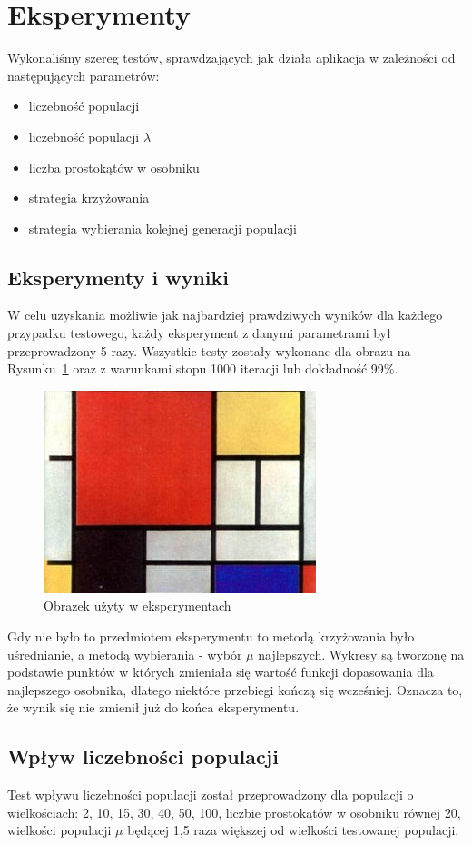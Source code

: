 \section{Eksperymenty}
Wykonaliśmy szereg testów, sprawdzających jak działa aplikacja w zależności od następujących parametrów:
\begin{itemize}
    \item liczebność populacji
    \item liczebność populacji $\lambda$
    \item liczba prostokątów w osobniku
    \item strategia krzyżowania
    \item strategia wybierania kolejnej generacji populacji
\end{itemize}

\subsection{Eksperymenty i wyniki}
W celu uzyskania możliwie jak najbardziej prawdziwych wyników dla każdego przypadku testowego, każdy eksperyment z danymi parametrami był przeprowadzony 5 razy. Wszystkie testy zostały wykonane dla obrazu na Rysunku~\ref{fig:test_image} oraz z warunkami stopu 1000 iteracji lub dokładność 99\%. 
\begin{figure}[H]
    \centering \includegraphics[width=0.5\linewidth]{img/simple_img.jpg}
    \caption{Obrazek użyty w eksperymentach}
    \label{fig:test_image}
\end{figure}
Gdy nie było to przedmiotem eksperymentu to metodą krzyżowania było uśrednianie, a metodą wybierania - wybór $\mu$ najlepszych. Wykresy są tworzonę na podstawie punktów w których zmieniała się wartość funkcji dopasowania dla najlepszego osobnika, dlatego niektóre przebiegi kończą się wcześniej. Oznacza to, że wynik się nie zmienił już do końca eksperymentu.

\subsection*{Wpływ liczebności populacji}
Test wpływu liczebności populacji został przeprowadzony dla populacji o wielkościach: 2, 10, 15, 30, 40, 50, 100, liczbie prostokątów w osobniku równej 20, wielkości populacji $\mu$ będącej 1,5 raza większej od wielkości testowanej populacji.

